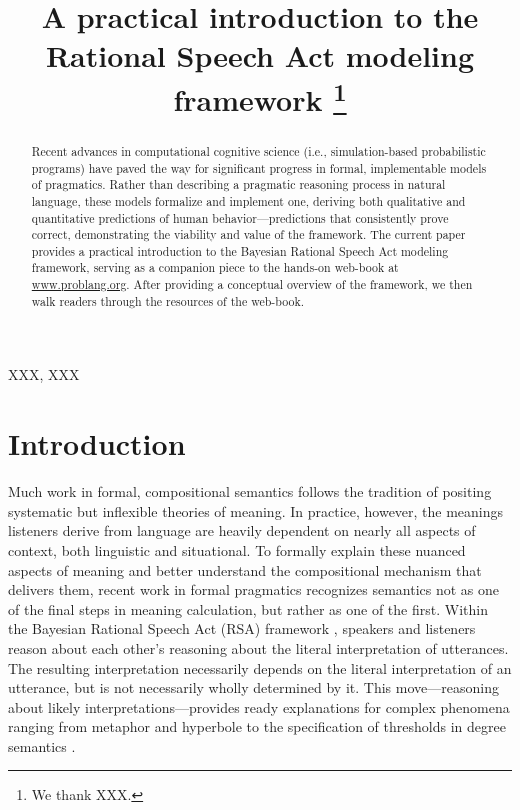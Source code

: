 \documentclass{sp}
\title[Practical introduction to RSA]{A practical introduction to the Rational Speech Act modeling framework%
	\thanks{We thank XXX.}}
\author[]{%
}
\begin{document}
\maketitle

\begin{abstract}
	Recent advances in computational cognitive science (i.e., simulation-based probabilistic programs) have paved the way for significant progress in formal, implementable models of pragmatics. Rather than describing a pragmatic reasoning process in natural language, these models formalize and implement one, deriving both qualitative and quantitative predictions of human behavior---predictions that consistently prove correct, demonstrating the viability and value of the framework. The current paper provides a practical introduction to the Bayesian Rational Speech Act modeling framework, serving as a companion piece to the hands-on web-book at \href{https://www.problang.org}{www.problang.org}. After providing a conceptual overview of the framework, we then walk readers through the resources of the web-book.
\end{abstract}

\begin{keywords}
	XXX, XXX
\end{keywords}

\tableofcontents

\section{Introduction}

Much work in formal, compositional semantics follows the tradition of positing systematic but inflexible theories of meaning. In practice, however, the meanings listeners derive from language are heavily dependent on nearly all aspects of context, both linguistic and situational. To formally explain these nuanced aspects of meaning and better understand the compositional mechanism that delivers them, recent work in formal pragmatics recognizes semantics not as one of the final steps in meaning calculation, but rather as one of the first. Within the Bayesian Rational Speech Act (RSA) framework \citep{goodmanfrank2016,frankejaeger2016}, speakers and listeners reason about each other's reasoning about the literal interpretation of utterances. The resulting interpretation necessarily depends on the literal interpretation of an utterance, but is not necessarily wholly determined by it. This move---reasoning about likely interpretations---provides ready explanations for complex phenomena ranging from metaphor \citep{kaoetal2014metaphor} and hyperbole \citep{kaoetal2014} to the specification of thresholds in degree semantics \citep{lassitergoodman2013}.
\end{document}
